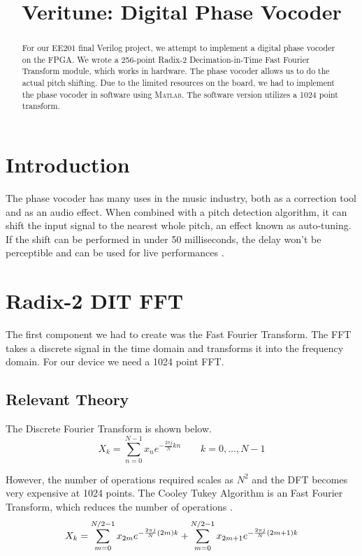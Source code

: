 \documentclass[twoside]{article}
\title{Veritune: Digital Phase Vocoder}
\begin{document}
\maketitle
%
\begin{abstract}
	For our EE201 final Verilog project, we attempt to implement a digital phase vocoder on the FPGA. 
	We wrote a 256-point Radix-2 Decimation-in-Time Fast Fourier Transform module, which works in hardware.  
	The phase vocoder allows us to do	the actual pitch shifting. Due to the limited resources on the board,
	we had to implement the phase vocoder in software using \textsc{Matlab}. The software version utilizes a 
	1024 point transform.
\end{abstract}

%
%
%
%
\section{Introduction}
  The phase vocoder has many uses in the music industry, both as a correction tool and as an audio effect.
  When combined with a pitch detection algorithm, it can shift the input signal to the nearest whole pitch, an effect known as auto-tuning.
  If the shift can be performed in under 50 milliseconds, the delay won't be perceptible and can be used for live performances \cite{bib:guitarpitchshifter}.
  

  
%
%
%
%
\section{Radix-2 DIT FFT}
  The first component we had to create was the Fast Fourier Transform. The FFT takes a discrete signal in the time domain and 
  transforms it into the frequency domain. For our device we need a 1024 point FFT.
  \subsection{Relevant Theory}
  The Discrete Fourier Transform is shown below.
  \begin{equation}
  	X_k = \sum_{n=0}^{N-1} x_n e^{-\frac{2 \pi j}{N} k n} \quad \quad k = 0, \dots, N-1
  	\label{eqn:dft}
  \end{equation}
  
  However, the number of operations required scales as $N^2$ and the DFT becomes very expensive at 1024 points.
  The Cooley Tukey Algorithm is an Fast Fourier Transform, which reduces the number of operations \cite{bib:ctdft}.
  \begin{equation}
  	 X_k  =	 \sum \limits_{m=0}^{N/2-1} x_{2m}     e^{-\frac{2\pi j}{N} (2m)k}\\   +  \sum \limits_{m=0}^{N/2-1} x_{2m+1} e^{-\frac{2\pi j}{N} (2m+1)k}
  	\label{eqn:ctdft}
  \end{equation} 
  
\end{document}
